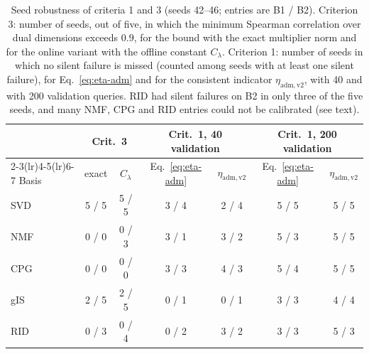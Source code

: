 \documentclass[11pt,a4paper]{article}
\begin{document}
\begin{table}[htbp]
\centering
\small
\caption{Seed robustness of criteria 1 and 3 (seeds 42--46; entries are B1 / B2). Criterion 3: number of seeds, out of five, in which the minimum Spearman correlation over dual dimensions exceeds $0.9$, for the bound with the exact multiplier norm and for the online variant with the offline constant $C_\lambda$. Criterion 1: number of seeds in which no silent failure is missed (counted among seeds with at least one silent failure), for Eq.~\eqref{eq:eta-adm} and for the consistent indicator $\eta_{\mathrm{adm,v2}}$, with 40 and with 200 validation queries. RID had silent failures on B2 in only three of the five seeds, and many NMF, CPG and RID entries could not be calibrated (see text).}
\label{tab:robust}
\begin{tabular}{@{}lcccccc@{}}
\toprule
 & \multicolumn{2}{c}{Crit.~3} & \multicolumn{2}{c}{Crit.~1, 40 validation} & \multicolumn{2}{c}{Crit.~1, 200 validation} \\
\cmidrule(lr){2-3}\cmidrule(lr){4-5}\cmidrule(lr){6-7}
Basis & exact & $C_\lambda$ & Eq.~\eqref{eq:eta-adm} & $\eta_{\mathrm{adm,v2}}$ & Eq.~\eqref{eq:eta-adm} & $\eta_{\mathrm{adm,v2}}$ \\
\midrule
SVD & 5 / 5 & 5 / 5 & 3 / 4 & 2 / 4 & 5 / 5 & 5 / 5 \\
NMF & 0 / 0 & 0 / 3 & 3 / 1 & 3 / 2 & 5 / 3 & 5 / 5 \\
CPG & 0 / 0 & 0 / 0 & 3 / 3 & 4 / 3 & 5 / 4 & 5 / 5 \\
gIS & 2 / 5 & 2 / 5 & 0 / 1 & 0 / 1 & 3 / 3 & 4 / 4 \\
RID & 0 / 3 & 0 / 4 & 0 / 2 & 3 / 2 & 3 / 3 & 5 / 3 \\
\bottomrule
\end{tabular}
\end{table}
\end{document}
